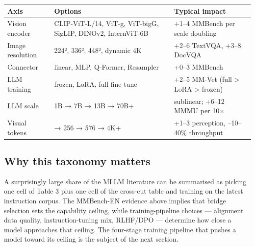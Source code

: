 {\def\LTcaptype{none} %
\begin{longtable}[]{@{}
  >{\raggedright\arraybackslash}p{}
  >{\raggedright\arraybackslash}p{}
  >{\raggedright\arraybackslash}p{}@{}}
\toprule\noalign{}
\begin{minipage}[b]{\linewidth}\raggedright
\textbf{Axis}
\end{minipage} & \begin{minipage}[b]{\linewidth}\raggedright
\textbf{Options}
\end{minipage} & \begin{minipage}[b]{\linewidth}\raggedright
\textbf{Typical impact}
\end{minipage} \\
\midrule\noalign{}
\endhead
\bottomrule\noalign{}
\endlastfoot
Vision encoder & CLIP-ViT-L/14, ViT-g, ViT-bigG, SigLIP, DINOv2, InternViT-6B & +1--4 MMBench per scale doubling \\
Image resolution & 224², 336², 448², dynamic 4K & +2--6 TextVQA, +3--8 DocVQA \\
Connector & linear, MLP, Q-Former, Resampler & +0--3 MMBench \\
LLM training & frozen, LoRA, full fine-tune & +2--5 MM-Vet (full \textgreater{} LoRA \textgreater{} frozen) \\
LLM scale & 1B → 7B → 13B → 70B+ & sublinear; +6--12 MMMU per 10× \\
Visual tokens & 32 → 256 → 576 → 4K+ & +1--3 perception, --10--40\% throughput \\
\end{longtable}
}

\subsection{Why this taxonomy matters}\label{why-this-taxonomy-matters}

A surprisingly large share of the MLLM literature can be summarised as picking one cell of Table 3 plus one cell of the cross-cut table and training on the latest instruction corpus. The MMBench-EN evidence above implies that bridge selection sets the capability ceiling, while training-pipeline choices --- alignment data quality, instruction-tuning mix, RLHF/DPO --- determine how close a model approaches that ceiling. The four-stage training pipeline that pushes a model toward its ceiling is the subject of the next section.

